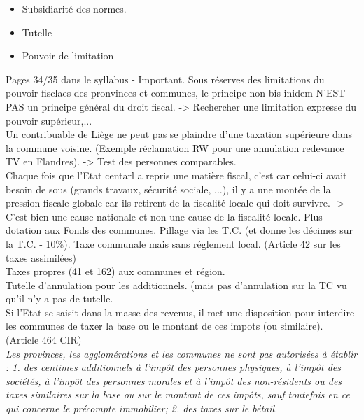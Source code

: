 \documentclass{book}
\begin{document}
\begin{itemize}
\item Subsidiarité des normes.
\item Tutelle
\item Pouvoir de limitation
\end{itemize}

\null

Pages 34/35 dans le syllabus - Important. Sous réserves des limitations du pouvoir fisclaes des pronvinces et communes, le principe non bis inidem N'EST PAS un principe général du droit fiscal. -> Rechercher une limitation expresse du pouvoir supérieur,...\\

Un contribuable de Liège ne peut pas se plaindre d'une taxation supérieure dans la commune voisine. (Exemple réclamation RW pour une annulation redevance TV en Flandres). -> Test des personnes comparables.\\

Chaque fois que l'Etat centarl a repris une matière fiscal, c'est car celui-ci avait besoin de sous (grands travaux, sécurité sociale, ...), il y a une montée de la pression fiscale globale car ils retirent de la fiscalité locale qui doit survivre. -> C'est bien une cause nationale et non une cause de la fiscalité locale. Plus dotation aux Fonds des communes.	Pillage via les T.C. (et donne les décimes sur la T.C. - 10\%). Taxe communale mais sans réglement local. (Article 42 sur les taxes assimilées)\\

Taxes propres (41 et 162) aux communes et région.\\

Tutelle d'annulation pour les additionnels. (mais pas d'annulation sur la TC vu qu'il n'y a pas de tutelle.\\

Si l'Etat se saisit dans la masse des revenus, il met une disposition pour interdire les communes de taxer la base ou le montant de ces impots (ou similaire). (Article 464 CIR)\\

\textit{Les provinces, les agglomérations et les communes ne sont pas autorisées à établir :
1. des centimes additionnels à l'impôt des personnes physiques, à l'impôt des sociétés, à l'impôt des
personnes morales et à l'impôt des non-résidents ou des taxes similaires sur la base ou sur le montant
de ces impôts, sauf toutefois en ce qui concerne le précompte immobilier;
2. des taxes sur le bétail.}
\end{document}
